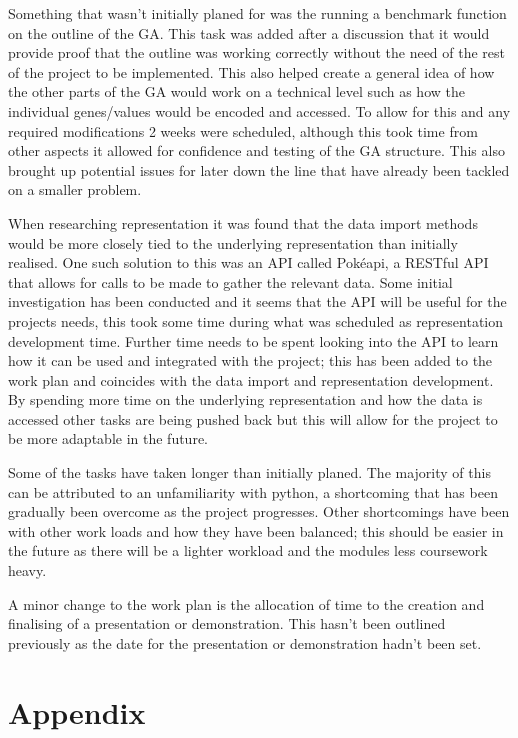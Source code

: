 \documentclass[a4paper]{article}
\newcommand{\Pokeapi}{Pok\'{e}api}
\begin{document}
Something that wasn't initially planed for was the running a benchmark function on the outline of the GA\@.
This task was added after a discussion that it would provide proof that the outline was working correctly without the need of the rest of the project to be implemented.
This also helped create a general idea of how the other parts of the GA would work on a technical level such as how the individual genes/values would be encoded and accessed.
To allow for this and any required modifications 2 weeks were scheduled, although this took time from other aspects it allowed for confidence and testing of the GA structure.
This also brought up potential issues for later down the line that have already been tackled on a smaller problem.
\par
When researching representation it was found that the data import methods would be more closely tied to the underlying representation than initially realised.
One such solution to this was an API called \Pokeapi{}, a RESTful API that allows for calls to be made to gather the relevant data.
Some initial investigation has been conducted and it seems that the API will be useful for the projects needs, this took some time during what was scheduled as representation development time.
Further time needs to be spent looking into the API to learn how it can be used and integrated with the project; this has been added to the work plan and coincides with the data import and representation development.
By spending more time on the underlying representation and how the data is accessed other tasks are being pushed back but this will allow for the project to be more adaptable in the future.
\par
Some of the tasks have taken longer than initially planed.
The majority of this can be attributed to an unfamiliarity with python, a shortcoming that has been gradually been overcome as the project progresses.
Other shortcomings have been with other work loads and how they have been balanced; this should be easier in the future as there will be a lighter workload and the modules less coursework heavy.
\par
A minor change to the work plan is the allocation of time to the creation and finalising of a presentation or demonstration.
This hasn't been outlined previously as the date for the presentation or demonstration hadn't been set.


\pagebreak
\section{Appendix}
\end{document}

